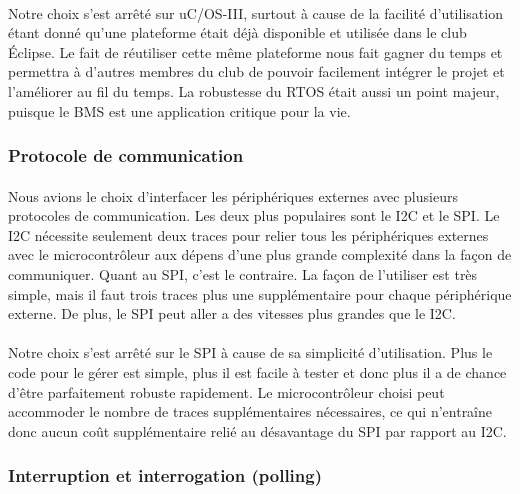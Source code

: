 		\paragraph*{}
		Notre choix s’est arrêté sur uC/OS-III, surtout à cause de la facilité d’utilisation étant donné qu’une plateforme était déjà disponible et utilisée dans le club Éclipse. Le fait de réutiliser cette même plateforme nous fait gagner du temps et permettra à d’autres membres du club de pouvoir facilement intégrer le projet et l’améliorer au fil du temps. La robustesse du RTOS était aussi un point majeur, puisque le BMS est une application critique pour la vie.

	\subsubsection{Protocole de communication}
		\paragraph*{}
		Nous avions le choix d’interfacer les périphériques externes avec plusieurs protocoles de communication. Les deux plus populaires sont le I2C et le SPI. Le I2C nécessite seulement deux traces pour relier tous les périphériques externes avec le microcontrôleur aux dépens d’une plus grande complexité dans la façon de communiquer. Quant au SPI, c’est le contraire. La façon de l’utiliser est très simple, mais il faut trois traces plus une supplémentaire pour chaque périphérique externe. De plus, le SPI peut aller a des vitesses plus grandes que le I2C.

		\paragraph*{}
		Notre choix s’est arrêté sur le SPI à cause de sa simplicité d’utilisation. Plus le code pour le gérer est simple, plus il est facile à tester et donc plus il a de chance d’être parfaitement robuste rapidement. Le microcontrôleur choisi peut accommoder le nombre de traces supplémentaires nécessaires, ce qui n’entraîne donc aucun coût supplémentaire relié au désavantage du SPI par rapport au I2C.

	\subsubsection{Interruption et interrogation (polling)}
